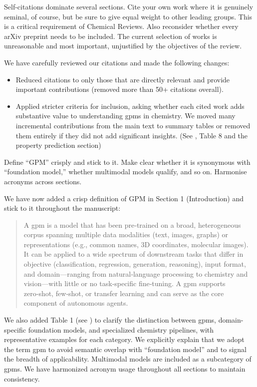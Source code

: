 \begin{point}
Self-citations dominate several sections. Cite your own work where it is genuinely seminal, of course, but be sure to give equal weight to other leading groups. This is a critical requirement of Chemical Reviews. Also reconsider whether every arXiv preprint needs to be included. The current selection of works is unreasonable and most important, unjustified by the objectives of the review.
\end{point}

\begin{reply}
We have carefully reviewed our citations and made the following changes:
\begin{itemize}
\item Reduced citations to only those that are directly relevant and provide important contributions (removed more than 50+ citations overall).
\item Applied stricter criteria for inclusion, asking whether each cited work adds substantive value to understanding \glspl{gpm} in chemistry. We moved many incremental contributions from the main text to summary tables or removed them entirely if they did not add significant insights.
(See , Table 8 and the property prediction section)
\end{itemize}

\end{reply}

\begin{point}
Define ``GPM'' crisply and stick to it. Make clear whether it is synonymous with ``foundation model,'' whether multimodal models qualify, and so on. Harmonise acronyms across sections.
\end{point}

\begin{reply}
We have now added a crisp definition of GPM in Section 1 (Introduction) and stick to it throughout the manuscript:
\begin{quote}
A \gls{gpm} is a model that has been pre‑trained on a broad, heterogeneous corpus spanning multiple data modalities (text, images, graphs) or representations (e.g., common names, 3D coordinates, molecular images).
It can be applied to a wide spectrum of downstream tasks that differ in objective (classification, regression, generation, reasoning), input format, and domain---ranging from natural‑language processing to chemistry and vision---with little or no task‑specific fine‑tuning.
A \gls{gpm} supports zero‑shot, few‑shot, or transfer learning and can serve as the core component of autonomous agents.
\end{quote}

We also added Table 1 (see ) to clarify the distinction between \glspl{gpm}, domain-specific foundation models, and specialized chemistry pipelines, with representative examples for each category. We explicitly explain that we adopt the term \gls{gpm} to avoid semantic overlap with ``foundation model'' and to signal the breadth of applicability. Multimodal models are included as a subcategory of \glspl{gpm}. We have harmonized acronym usage throughout all sections to maintain consistency.
\end{reply}

